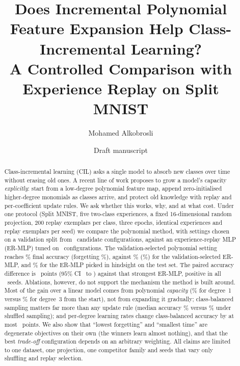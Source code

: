 \documentclass[11pt,a4paper]{article}
\title{Does Incremental Polynomial Feature Expansion Help Class-Incremental Learning?\\
\large A Controlled Comparison with Experience Replay on Split MNIST}
\author{Mohamed Alkobrosli}
\date{Draft manuscript}
\begin{document}
\maketitle

\begin{abstract}
\noindent Class-incremental learning (CIL) asks a single model to absorb new classes over time without erasing old ones.
A recent line of work proposes to grow a model's capacity \emph{explicitly}: start from a low-degree polynomial feature map, append zero-initialised higher-degree monomials as classes arrive, and protect old knowledge with replay and per-coefficient update rules.
We ask whether this works, why, and at what cost.
Under one protocol (Split MNIST, five two-class experiences, a fixed 16-dimensional random projection, 200 replay exemplars per class, three epochs, identical experiences and replay exemplars per seed) we compare the polynomial method, with settings chosen on a validation split from \numPolyCandidatesThree\ candidate configurations, against an experience-replay MLP (ER-MLP) tuned on \numErCandidates\ configurations.
The validation-selected polynomial setting reaches \numPolyBestAcc\% final accuracy (forgetting \numPolyBestForg\%), against \numErBestAcc\% (\numErBestForg\%) for the validation-selected ER-MLP, and \numErHindAcc\% for the ER-MLP picked in hindsight on the test set.
The paired accuracy difference is \numPairedERMLPhindsightbAccDiff\ points ($95\%$ CI \numPairedERMLPhindsightbAccLo\ to \numPairedERMLPhindsightbAccHi) against that strongest ER-MLP, positive in all \numTestSeeds\ seeds.
Ablations, however, do not support the mechanism the method is built around.
Most of the gain over a linear model comes from polynomial \emph{capacity} (\numPolyLinearAcc\% for degree~1 versus \numPolyFixedCapAcc\% for degree~3 from the start), not from expanding it gradually; class-balanced sampling matters far more than any update rule (median accuracy \numMedianClassBalancedAcc\% versus \numMedianShuffledAcc\% under shuffled sampling); and per-degree learning rates change class-balanced accuracy by at most \numPerDegreeGainCbMax\ points.
We also show that ``lowest forgetting'' and ``smallest time'' are degenerate objectives on their own (the winners learn almost nothing), and that the best \emph{trade-off} configuration depends on an arbitrary weighting.
All claims are limited to one dataset, one projection, one competitor family and seeds that vary only shuffling and replay selection.
\end{abstract}
\end{document}
